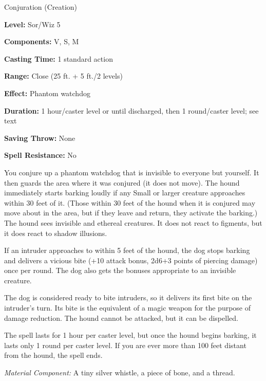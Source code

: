 
Conjuration (Creation)

\textbf{Level:} Sor/Wiz 5

\textbf{Components:} V, S, M

\textbf{Casting Time:} 1 standard action

\textbf{Range:} Close (25 ft. + 5 ft./2 levels)

\textbf{Effect:} Phantom watchdog

\textbf{Duration:} 1 hour/caster level or until discharged, then 1 round/caster 
level; see text

\textbf{Saving Throw:} None

\textbf{Spell Resistance:} No

You conjure up a phantom watchdog that is invisible to everyone but yourself. It 
then guards the area where it was conjured (it does not move). The hound immediately 
starts barking loudly if any Small or larger creature approaches within 30 feet 
of it. (Those within 30 feet of the hound when it is conjured may move about in 
the area, but if they leave and return, they activate the barking.) The hound sees 
invisible and ethereal creatures. It does not react to figments, but it does react 
to shadow illusions.

If an intruder approaches to within 5 feet of the hound, the dog stops barking 
and delivers a vicious bite (+10 attack bonus, 2d6+3 points of piercing damage) 
once per round. The dog also gets the bonuses appropriate to an invisible creature.

The dog is considered ready to bite intruders, so it delivers its first bite on 
the intruder's turn. Its bite is the equivalent of a magic weapon for the purpose 
of damage reduction. The hound cannot be attacked, but it can be dispelled.

The spell lasts for 1 hour per caster level, but once the hound begins barking, 
it lasts only 1 round per caster level. If you are ever more than 100 feet distant 
from the hound, the spell ends.

\textit{Material Component:} A tiny silver whistle, a piece of bone, and a thread.

